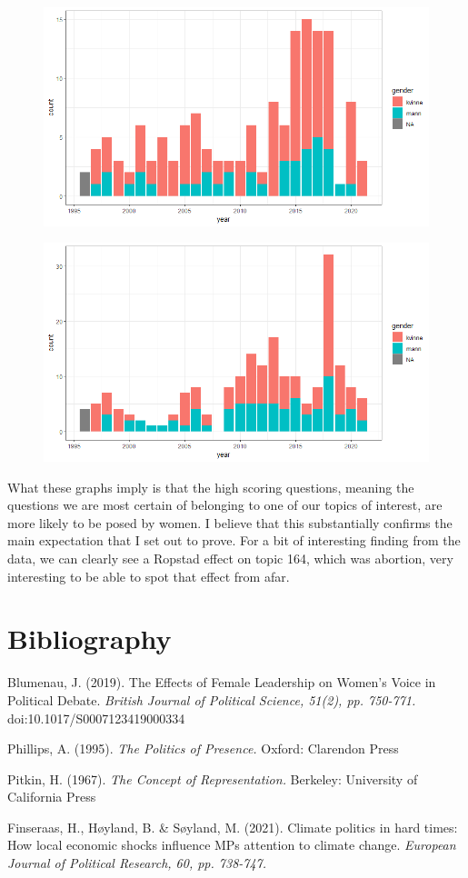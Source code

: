 \documentclass[12pt]{article}
\begin{document}
	\begin{figure}[h]
		\centering
		\includegraphics[scale=0.80]{Img/135dist.png}
	\end{figure}
	
	\begin{figure}[h]
		\centering
		\includegraphics[scale=0.80]{Img/164dist.png}
	\end{figure}

	What these graphs imply is that the high scoring questions, meaning the questions we are most certain of belonging to one of our topics of interest, are more likely to be posed by women. I believe that this substantially confirms the main expectation that I set out to prove. For a bit of interesting finding from the data, we can clearly see a Ropstad effect on topic 164, which was abortion, very interesting to be able to spot that effect from afar.

	\section{Bibliography}
	
	{\parindent-10pt
		Blumenau, J. (2019). The Effects of Female Leadership on Women’s Voice in
		Political Debate. \textit{British Journal of Political Science, 51(2), pp. 750-771.} doi:10.1017/S0007123419000334 
		
		Phillips, A. (1995). \textit{The Politics of Presence.} Oxford: Clarendon Press
		
		Pitkin, H. (1967). \textit{The Concept of Representation.} Berkeley: University of California Press
		
		Finseraas, H., Høyland, B. \& Søyland, M. (2021). Climate politics in hard times: How local economic shocks influence MPs attention to climate change. \textit{European Journal of Political Research, 60, pp. 738-747.}
	}
	
\end{document}
